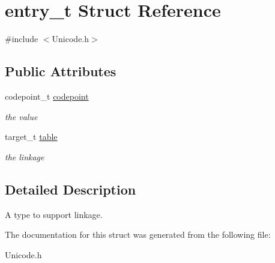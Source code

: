 \hypertarget{structentry__t}{}\section{entry\+\_\+t Struct Reference}
\label{structentry__t}


{\ttfamily \#include $<$Unicode.\+h$>$}

\subsection*{Public Attributes}
\begin{DoxyCompactItemize}
\item 
\hypertarget{structentry__t_a1e82af966dbc9caa8129a7b4320417bc}{}codepoint\+\_\+t \hyperlink{structentry__t_a1e82af966dbc9caa8129a7b4320417bc}{codepoint}\label{structentry__t_a1e82af966dbc9caa8129a7b4320417bc}

\begin{DoxyCompactList}\small\item\em the value \end{DoxyCompactList}\item 
\hypertarget{structentry__t_aee9f08e356b624555bb6101ea4633f3a}{}target\+\_\+t \hyperlink{structentry__t_aee9f08e356b624555bb6101ea4633f3a}{table}\label{structentry__t_aee9f08e356b624555bb6101ea4633f3a}

\begin{DoxyCompactList}\small\item\em the linkage \end{DoxyCompactList}\end{DoxyCompactItemize}


\subsection{Detailed Description}
A type to support linkage. 

The documentation for this struct was generated from the following file\+:\begin{DoxyCompactItemize}
\item 
Unicode.\+h\end{DoxyCompactItemize}
